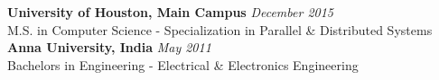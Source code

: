 {\bf University of Houston, Main Campus}     \hfill {\em December 2015} \\
M.S. in Computer Science - Specialization in Parallel \& Distributed Systems \smallskip \\
{\bf Anna University, India}                 \hfill {\em May 2011} \\
Bachelors in Engineering - Electrical \& Electronics Engineering \smallskip

